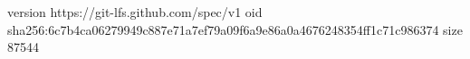 version https://git-lfs.github.com/spec/v1
oid sha256:6c7b4ca06279949c887e71a7ef79a09f6a9e86a0a4676248354ff1c71c986374
size 87544
